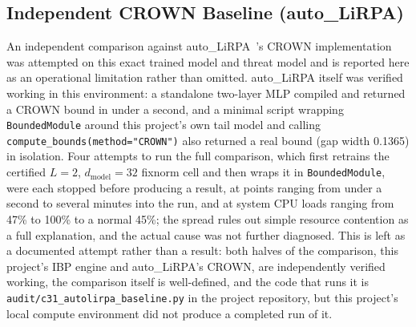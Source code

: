 \documentclass[10pt,journal]{IEEEtran}
\begin{document}
\subsection{Independent CROWN Baseline (auto\_LiRPA)}
\label{sec:crownbaseline}
An independent comparison against auto\_LiRPA~\cite{xu2020autolirpa}'s CROWN implementation was attempted on this exact trained model and threat model and is reported here as an operational limitation rather than omitted. auto\_LiRPA itself was verified working in this environment: a standalone two-layer MLP compiled and returned a CROWN bound in under a second, and a minimal script wrapping \texttt{BoundedModule} around this project's own tail model and calling \texttt{compute\_bounds(method="CROWN")} also returned a real bound (gap width 0.1365) in isolation. Four attempts to run the full comparison, which first retrains the certified $L=2$, $d_{\text{model}}=32$ fixnorm cell and then wraps it in \texttt{BoundedModule}, were each stopped before producing a result, at points ranging from under a second to several minutes into the run, and at system CPU loads ranging from 47\% to 100\% to a normal 45\%; the spread rules out simple resource contention as a full explanation, and the actual cause was not further diagnosed. This is left as a documented attempt rather than a result: both halves of the comparison, this project's IBP engine and auto\_LiRPA's CROWN, are independently verified working, the comparison itself is well-defined, and the code that runs it is \texttt{audit/c31\_autolirpa\_baseline.py} in the project repository, but this project's local compute environment did not produce a completed run of it.
\end{document}
